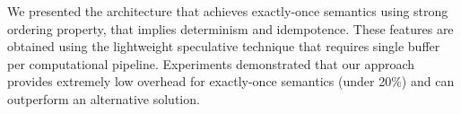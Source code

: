 \label {fs-short-conclusion}

We presented the architecture that achieves exactly-once semantics using strong ordering property, that implies determinism and idempotence. These features are obtained using the lightweight speculative technique that requires single buffer per computational pipeline. Experiments demonstrated that our approach provides extremely low overhead for exactly-once semantics (under 20\%) and can outperform an alternative solution.

